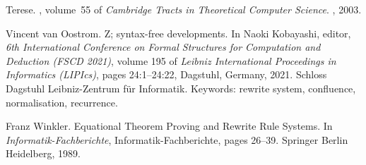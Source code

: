 \documentclass[a4paper]{article}
\begin{document}
\begin{thebibliography}{FNvOS16}
{Terese}.
, volume~55 of {\em Cambridge
  {{Tracts}} in {{Theoretical Computer Science}}}.
, 2003.

Vincent {van Oostrom}.
\newblock Z; syntax-free developments.
\newblock In Naoki Kobayashi, editor, {\em 6th International Conference on
  Formal Structures for Computation and Deduction ({{FSCD}} 2021)}, volume 195
  of {\em Leibniz International Proceedings in Informatics ({{LIPIcs}})}, pages
  24:1--24:22, {Dagstuhl, Germany}, 2021. {Schloss Dagstuhl \textendash{}
  Leibniz-Zentrum f\"ur Informatik}.
\newblock Keywords: rewrite system, confluence, normalisation, recurrence.

Franz Winkler.
\newblock Equational {{Theorem Proving}} and {{Rewrite Rule Systems}}.
\newblock In {\em Informatik-{{Fachberichte}}}, Informatik-{{Fachberichte}},
  pages 26--39. {Springer Berlin Heidelberg}, 1989.

\end{thebibliography}






\end{document}

